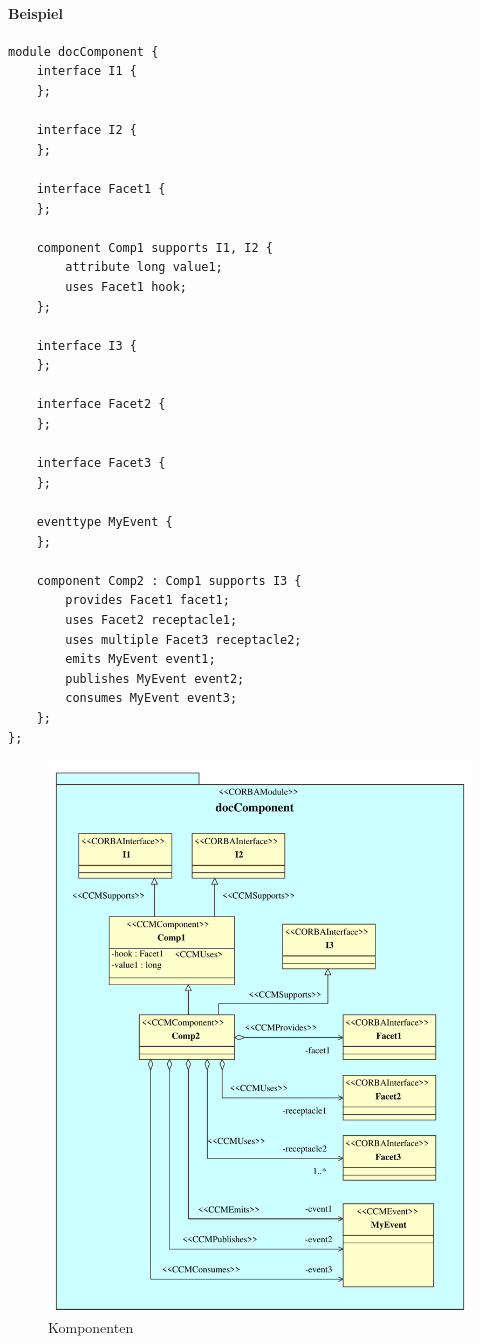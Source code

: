 \documentclass [a4paper,10pt] {scrartcl}
\begin{document}
\paragraph{Beispiel}
\begin{verbatim}
module docComponent {
    interface I1 {
    };

    interface I2 {
    };

    interface Facet1 {
    };

    component Comp1 supports I1, I2 {
        attribute long value1;
        uses Facet1 hook;
    };

    interface I3 {
    };

    interface Facet2 {
    };

    interface Facet3 {
    };

    eventtype MyEvent {
    };

    component Comp2 : Comp1 supports I3 {
        provides Facet1 facet1;
        uses Facet2 receptacle1;
        uses multiple Facet3 receptacle2;
        emits MyEvent event1;
        publishes MyEvent event2;
        consumes MyEvent event3;
    };
};
\end{verbatim}
\begin{figure}[!h]
\centerline{\includegraphics[width=\linewidth]{docComponent}}
\caption{Komponenten}
\label{fig:component}
\end{figure}
\end{document}

